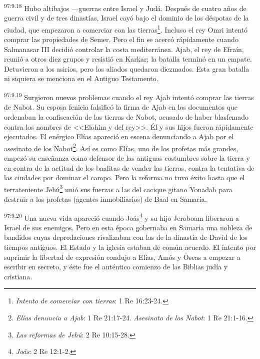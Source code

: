 \par
\textsuperscript{97:9.18} Hubo altibajos ---guerras entre Israel y Judá. Después de cuatro años de guerra civil y de tres dinastías, Israel cayó bajo el dominio de los déspotas de la ciudad, que empezaron a comerciar con las tierras\footnote{\textit{Intento de comerciar con tierras}: 1 Re 16:23-24.}. Incluso el rey Omri intentó comprar las propiedades de Semer. Pero el fin se acercó rápidamente cuando Salmanasar III decidió controlar la costa mediterránea. Ajab, el rey de Efraín, reunió a otros diez grupos y resistió en Karkar; la batalla terminó en un empate. Detuvieron a los asirios, pero los aliados quedaron diezmados. Esta gran batalla ni siquiera se menciona en el Antiguo Testamento.

\par
\textsuperscript{97:9.19} Surgieron nuevos problemas cuando el rey Ajab intentó comprar las tierras de Nabot. Su esposa fenicia falsificó la firma de Ajab en los documentos que ordenaban la confiscación de las tierras de Nabot, acusado de haber blasfemado contra los nombres de <<Elohim y del rey>>. Él y sus hijos fueron rápidamente ejecutados. El enérgico Elías apareció en escena denunciando a Ajab por el asesinato de los Nabot\footnote{\textit{Elías denuncia a Ajab}: 1 Re 21:17-24. \textit{Asesinato de los Nabot}: 1 Re 21:1-16.}. Así es como Elías, uno de los profetas más grandes, empezó su enseñanza como defensor de las antiguas costumbres sobre la tierra y en contra de la actitud de los baalitas de vender las tierras, contra la tentativa de las ciudades por dominar el campo. Pero la reforma no tuvo éxito hasta que el terrateniente Jehú\footnote{\textit{Las reformas de Jehú}: 2 Re 10:15-28.} unió sus fuerzas a las del cacique gitano Yonadab para destruir a los profetas (agentes inmobiliarios) de Baal en Samaria.

\par
\textsuperscript{97:9.20} Una nueva vida apareció cuando Joás\footnote{\textit{Joás}: 2 Re 12:1-2.} y su hijo Jeroboam liberaron a Israel de sus enemigos. Pero en esta época gobernaba en Samaria una nobleza de bandidos cuyas depredaciones rivalizaban con las de la dinastía de David de los tiempos antiguos. El Estado y la iglesia estaban de común acuerdo. El intento por suprimir la libertad de expresión condujo a Elías, Amós y Oseas a empezar a escribir en secreto, y éste fue el auténtico comienzo de las Biblias judía y cristiana.

